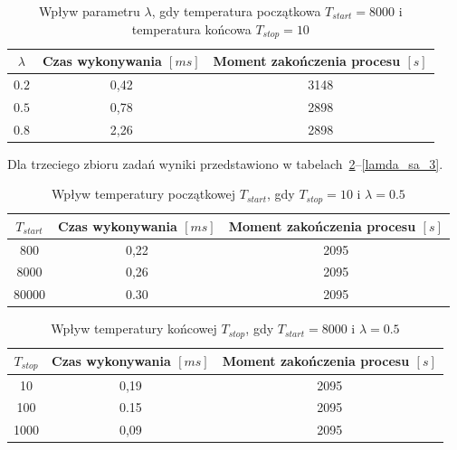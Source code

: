 \begin{table}[H]
	\centering
	\caption{Wpływ parametru $\lambda$, gdy temperatura początkowa $T_{start}=8000$ i temperatura końcowa $T_{stop}=10$}
	\label{lamda_sa_2}
	\begin{tabular}{ccc}
		\toprule
		$\lambda$ & Czas wykonywania $[ms]$ & Moment zakończenia procesu $[s]$ \\
		\midrule
		$0.2$     & 0,42                    & 3148                              \\
		$0.5$     & 0,78                    & 2898                              \\
		$0.8$     & 2,26                    & 2898                              \\
		\bottomrule
	\end{tabular}
\end{table}

Dla trzeciego zbioru zadań wyniki przedstawiono w tabelach~\ref{tstart_sa_3}--\ref{lamda_sa_3}.

\begin{table}[H]
	\centering
	\label{tstart_sa_3}
	\caption{Wpływ temperatury początkowej $T_{start}$, gdy $T_{stop}=10$ i $\lambda=0.5$}
	\begin{tabular}{ccc}
		\toprule
		$T_{start}$ & Czas wykonywania $[ms]$ & Moment zakończenia procesu $[s]$ \\
		\midrule
		800         & 0,22                    & 2095                              \\
		8000        & 0,26                    & 2095                              \\
		80000       & 0.30                    & 2095                              \\
		\bottomrule
	\end{tabular}
\end{table}

\begin{table}[H]
	\centering
	\label{tstop_sa_3}
	\caption{Wpływ temperatury końcowej $T_{stop}$, gdy $T_{start}=8000$ i $\lambda=0.5$}
	\begin{tabular}{ccc}
		\toprule
		$T_{stop}$ & Czas wykonywania $[ms]$ & Moment zakończenia procesu $[s]$ \\
		\midrule
		10         & 0,19                    & 2095                              \\
		100        & 0.15                    & 2095                              \\
		1000       & 0,09                    & 2095                              \\
		\bottomrule
	\end{tabular}
\end{table}

